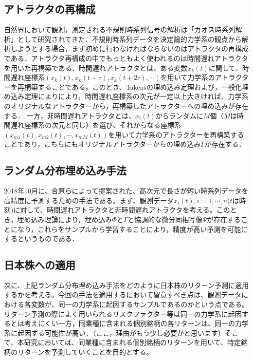 \documentclass[JEL]{AEA}
\begin{document}
\subsection{アトラクタの再構成}
自然界において観測，測定される不規則時系列信号の解析は「カオス時系列解析」として研究されてきた．不規則時系列データを決定論的力学系の観点から解析しようとする場合，まず初めに行わなければならないのはアトラクタの再構成である\cite{sauer}．アトラクタ再構成の中でもっともよく使われるのは時間遅れアトラクタを用いた再構築である．時間遅れアトラクタとは、ある変数$x_{k}(t)$に関して、時間遅れ座標系$(x_{k}(t),x_{k}(t+\tau),x_{k}(t+2\tau),\cdots)$を用いて力学系のアトラクターを再構築することである。このとき、Takensの埋め込み定理\cite{takens}および，一般化埋め込み定理\cite{sauer}によりにより，時間遅れ座標系の次元が一定以上大きければ、力学系のオリジナルなアトラクターから，再構築したアトラクターへの埋め込みが存在する．
一方，非時間遅れアトラクタとは、$x_{i}(t)$からランダムに$M$個（$M$は時間遅れ座標系の次元と同じ）を選び、それからなる座標系$(x_{m1}(t),x_{m2}(t),\cdots,x_{mM}(t))$を用いて力学系のアトラクターを再構築することであり，こちらにもオリジナルアトラクターからの埋め込み$\Gamma$が存在する．

\subsection{ランダム分布埋め込み手法}
2018年10月に、合原ら\cite{aihara}によって提案された、高次元で長さが短い時系列データを高精度に予測するための手法である。まず、観測データ$x_{i}(t),i={1,\cdots,n}$($t$は時刻)に対して、時間遅れアトラクタと非時間遅れアトラクタを考える。このとき，埋め込み理論により，埋め込み$\Phi$と$\Gamma$と協調的な微分同相写像$\Psi$が存在することになり\cite{sauer}，これらをサンプルから学習することにより，精度が高い予測を可能にするというものである．

\subsection{日本株への適用}

次に、上記ランダム分布埋め込み手法をどのように日本株のリターン予測に適用するかを考える。今回の手法を適用するにおいて留意すべき点は、観測データにおける各変数が、同一の力学系に起因するサンプルであるのかという点である。
リターン予測の際によく用いられるリスクファクター等は同一の力学系に起因するとは考えにくい一方，同業種に含まれる個別銘柄の各リターンは、同一の力学系に起因する可能性が高い．（ここ，理由がもう少し必要かと思います）そこで、本研究においては、同業種に含まれる個別銘柄のリターンを用いて、特定銘柄のリターンを予測していくことを目的とする。
\end{document}
